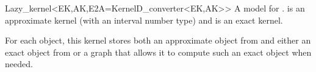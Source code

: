 \begin{ccRefClass}{Lazy_kernel<EK,AK,E2A=KernelD_converter<EK,AK>>}
\ccDefinition
A model for .
 is an approximate kernel (with an interval number type) and 
is an exact kernel.

\ccIsModel
{}

\ccImplementation
For each object, this kernel stores both an approximate object from
 and either an exact object from  or a graph that
allows it to compute such an exact object when needed.

\end{ccRefClass}
